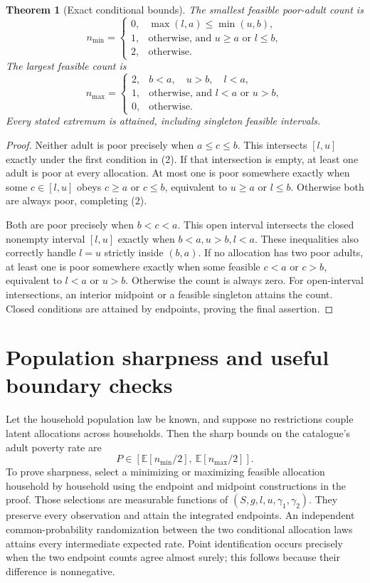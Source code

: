 \documentclass[11pt,a4paper]{article}
\newtheorem{theorem}{Theorem}[section]
\newcommand{\E}{\mathbb E}
\begin{document}
\begin{theorem}[Exact conditional bounds]
The smallest feasible poor-adult count is
\[
 n_{\min}=\begin{cases}
 0,&\max(l,a)\le\min(u,b),\\
 1,&\text{otherwise, and }u\ge a\text{ or }l\le b,\\
 2,&\text{otherwise}.
 \end{cases} \tag{2}
\]
The largest feasible count is
\[
 n_{\max}=\begin{cases}
 2,&b<a,\quad u>b,\quad l<a,\\
 1,&\text{otherwise, and }l<a\text{ or }u>b,\\
 0,&\text{otherwise}.
 \end{cases} \tag{3}
\]
Every stated extremum is attained, including singleton feasible intervals.
\end{theorem}
\begin{proof}
Neither adult is poor precisely when $a\le c\le b$. This intersects $[l,u]$ exactly under the first condition in (2). If that intersection is empty, at least one adult is poor at every allocation. At most one is poor somewhere exactly when some $c\in[l,u]$ obeys $c\ge a$ or $c\le b$, equivalent to $u\ge a$ or $l\le b$. Otherwise both are always poor, completing (2).

Both are poor precisely when $b<c<a$. This open interval intersects the closed nonempty interval $[l,u]$ exactly when $b<a,u>b,l<a$. These inequalities also correctly handle $l=u$ strictly inside $(b,a)$. If no allocation has two poor adults, at least one is poor somewhere exactly when some feasible $c<a$ or $c>b$, equivalent to $l<a$ or $u>b$. Otherwise the count is always zero. For open-interval intersections, an interior midpoint or a feasible singleton attains the count. Closed conditions are attained by endpoints, proving the final assertion.
\end{proof}

\section{Population sharpness and useful boundary checks}
Let the household population law be known, and suppose no restrictions couple latent allocations across households. Then the sharp bounds on the catalogue's adult poverty rate are
\[
 P\in\left[\E[n_{\min}/2],\ \E[n_{\max}/2]\right]. \tag{4}
\]
To prove sharpness, select a minimizing or maximizing feasible allocation household by household using the endpoint and midpoint constructions in the proof. Those selections are measurable functions of $(S,g,l,u,\gamma_1,\gamma_2)$. They preserve every observation and attain the integrated endpoints. An independent common-probability randomization between the two conditional allocation laws attains every intermediate expected rate. Point identification occurs precisely when the two endpoint counts agree almost surely; this follows because their difference is nonnegative.
\end{document}
